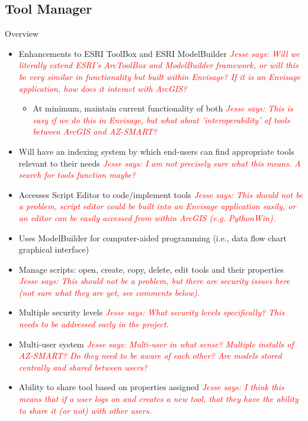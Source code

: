 \documentclass[titlepage]{article}
\begin{document}
\subsection{Tool Manager}
Overview
\begin{itemize}
	\item Enhancements to ESRI ToolBox and ESRI ModelBuilder
		\textcolor{red}{\textit{Jesse says: Will we literally extend ESRI's ArcToolBox and ModelBuilder framework, or will this be very similar in functionality but built within Envisage?  If it is an Envisage application, how does it interact with ArcGIS?}}
		\begin{itemize}
			\item At minimum, maintain current functionality of both
				\textcolor{red}{\textit{Jesse says: This is easy if we do this in Envisage, but what about 'interoperability' of tools between ArcGIS and AZ-SMART?}}
		\end{itemize}
	\item Will have an indexing system by which end-users can find appropriate tools relevant to their needs
		\textcolor{red}{\textit{Jesse says: I am not precisely sure what this means. A search for tools function maybe?}}
	\item Accesses Script Editor to code/implement tools
		\textcolor{red}{\textit{Jesse says: This should not be a problem, script editor could be built into an Envisage application easily, or an editor can be easily accessed from within ArcGIS (e.g. PythonWin).}}
	\item Uses ModelBuilder for computer-aided programming (i.e., data flow chart graphical interface)
	\item Manage scripts: open, create, copy, delete, edit tools and their properties
		\textcolor{red}{\textit{Jesse says: This should not be a problem, but there are security issues here (not sure what they are yet, see comments below).}}
	\item Multiple security levels
		\textcolor{red}{\textit{Jesse says: What security levels specifically?  This needs to be addressed early in the project.}}
	\item Multi-user system
		\textcolor{red}{\textit{Jesse says: Multi-user in what sense?  Multiple installs of AZ-SMART?  Do they need to be aware of each other?  Are models stored centrally and shared between users?}}
	\item Ability to share tool based on properties assigned
		\textcolor{red}{\textit{Jesse says: I think this means that if a user logs on and creates a new tool, that they have the ability to share it (or not) with other users.}}

\end{itemize}
\end{document}
